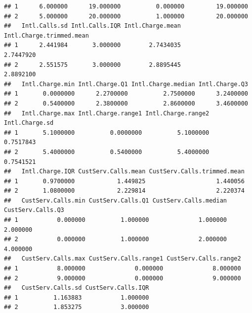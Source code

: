 \documentclass{article}\usepackage[]{graphicx}\usepackage[]{color}
\makeatletter
\newenvironment{kframe}{%
 \def\at@end@of@kframe{}%
 \ifinner\ifhmode%
  \def\at@end@of@kframe{\end{minipage}}%
  \begin{minipage}{\columnwidth}%
 \fi\fi%
 \def\FrameCommand##1{\hskip\@totalleftmargin \hskip-\fboxsep
 \colorbox{shadecolor}{##1}\hskip-\fboxsep
     \hskip-\linewidth \hskip-\@totalleftmargin \hskip\columnwidth}%
 \MakeFramed {\advance\hsize-\width
   \@totalleftmargin\z@ \linewidth\hsize
   \@setminipage}}%
 {\par\unskip\endMakeFramed%
 \at@end@of@kframe}
\newenvironment{knitrout}{}{} %
\makeatother
\begin{document}
\begin{description}
\begin{knitrout}
\begin{kframe}
\begin{verbatim}
## 1      6.000000      19.000000          0.000000         19.000000
## 2      5.000000      20.000000          1.000000         20.000000
##   Intl.Calls.sd Intl.Calls.IQR Intl.Charge.mean Intl.Charge.trimmed.mean
## 1      2.441984       3.000000        2.7434035                2.7447920
## 2      2.551575       3.000000        2.8895445                2.8892100
##   Intl.Charge.min Intl.Charge.Q1 Intl.Charge.median Intl.Charge.Q3
## 1       0.0000000      2.2700000          2.7500000      3.2400000
## 2       0.5400000      2.3800000          2.8600000      3.4600000
##   Intl.Charge.max Intl.Charge.range1 Intl.Charge.range2 Intl.Charge.sd
## 1       5.1000000          0.0000000          5.1000000      0.7517843
## 2       5.4000000          0.5400000          5.4000000      0.7541521
##   Intl.Charge.IQR CustServ.Calls.mean CustServ.Calls.trimmed.mean
## 1       0.9700000            1.449825                    1.440056
## 2       1.0800000            2.229814                    2.220374
##   CustServ.Calls.min CustServ.Calls.Q1 CustServ.Calls.median CustServ.Calls.Q3
## 1           0.000000          1.000000              1.000000          2.000000
## 2           0.000000          1.000000              2.000000          4.000000
##   CustServ.Calls.max CustServ.Calls.range1 CustServ.Calls.range2
## 1           8.000000              0.000000              8.000000
## 2           9.000000              0.000000              9.000000
##   CustServ.Calls.sd CustServ.Calls.IQR
## 1          1.163883           1.000000
## 2          1.853275           3.000000
\end{verbatim}
\end{kframe}
\end{knitrout}


\end{description}
\end{document}
